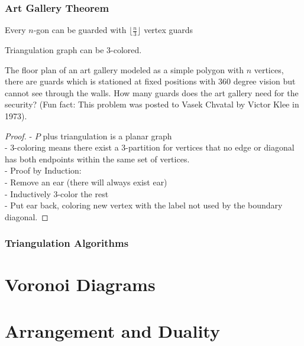 				\subsection{Art Gallery Theorem}
					\begin{theorem}
						Every $n$-gon can be guarded with $\lfloor \frac{n}{3} \rfloor$ vertex guards
					\end{theorem}

					\begin{lemma}
						Triangulation graph can be 3-colored.
					\end{lemma}

					\begin{problem}
						The floor plan of an art gallery modeled as a simple polygon with $n$ vertices, there are guards which is stationed at fixed positions with 360 degree vision but cannot see through the walls. How many guards does the art gallery need for the security? (Fun fact: This problem was posted to Vasek Chvatal by Victor Klee in 1973).				
					\end{problem}

					\begin{proof}
						- $P$ plus triangulation is a planar graph\\
						- 3-coloring means there exist a 3-partition for vertices that no edge or diagonal has both endpoints within the same set of vertices.\\
						- Proof by Induction:\\
						\indent - Remove an ear (there will always exist ear) \\
						\indent - Inductively 3-color the rest\\
						\indent - Put ear back, coloring new vertex with the label not used by the boundary diagonal.
					\end{proof}

				\subsection{Triangulation Algorithms}

		\chapter{Voronoi Diagrams}

		\chapter{Arrangement and Duality}

